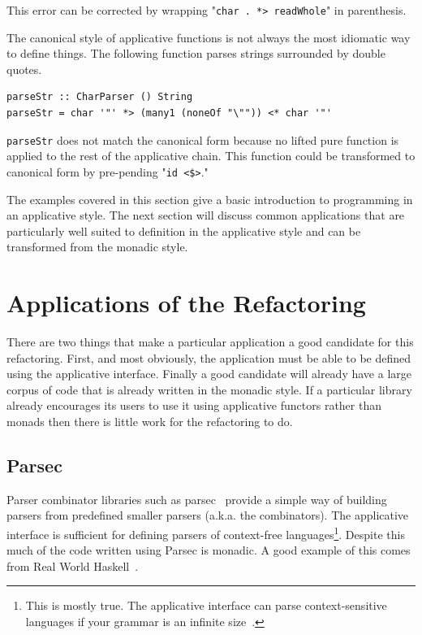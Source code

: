 This error can be corrected by wrapping "\texttt{char \textquotesingle.\textquotesingle~*> readWhole}" in parenthesis. 
 
The canonical style of applicative functions is not always the most idiomatic way to define things. The following function parses strings surrounded by double quotes.

\begin{lstlisting}[frame=tblr]
parseStr :: CharParser () String 
parseStr = char '"' *> (many1 (noneOf "\"")) <* char '"'
\end{lstlisting}

\texttt{parseStr} does not match the canonical form because no lifted pure function is applied to the rest of the applicative chain. This function could be transformed to canonical form by pre-pending "\texttt{id <\$>}."

The examples covered in this section give a basic introduction to programming in an applicative style. The next section will discuss common applications that are particularly well suited to definition in the applicative style and can be transformed from the monadic style. 

\section{Applications of the Refactoring}
\label{sec:appApps}

There are two things that make a particular application a good candidate for this refactoring. First, and most obviously, the application must be able to be defined using the applicative interface. Finally a good candidate will already have a large corpus of code that is already written in the monadic style. If a particular library already encourages its users to use it using applicative functors rather than monads then there is little work for the refactoring to do.

\subsection{Parsec}
Parser combinator libraries such as parsec~\citep{parsec} provide a simple way of building parsers from predefined smaller parsers (a.k.a. the combinators). The applicative interface is sufficient for defining parsers of context-free languages\footnote{This is mostly true. The applicative interface can parse context-sensitive languages if your grammar is an infinite size~\citep{appContextSens}.}. Despite this much of the code written using Parsec is monadic. A good example of this comes from Real World Haskell~\citep{realWorldHaskell}.

